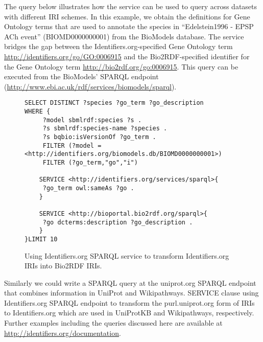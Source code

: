 \documentclass{bioinfo}
\begin{document}
The query below illustrates how the service can be used to query across datasets with different IRI schemes. In this example, we obtain the definitions for Gene Ontology terms that are used to annotate the species in ``Edelstein1996 - EPSP ACh event'' (BIOMD0000000001) from the BioModels database. The service bridges the gap between the Identifiers.org-specified Gene Ontology term \href{http://identifiers.org/go/GO:0006915}{http://identifiers.org/go/GO:0006915} and the Bio2RDF-specified identifier for the Gene Ontology term \href{http://bio2rdf.org/go:0006915} {http://bio2rdf.org/go:0006915}. This query can be executed from the BioModels' SPARQL endpoint (\href{http://www.ebi.ac.uk/rdf/services/biomodels/sparql}{http://www.ebi.ac.uk/rdf/services/biomodels/sparql}).

\begin{figure}[h]
{\scriptsize
\begin{verbatim}
SELECT DISTINCT ?species ?go_term ?go_description 
WHERE {
     ?model sbmlrdf:species ?s . 
	 ?s sbmlrdf:species-name ?species .
     ?s bqbio:isVersionOf ?go_term .
	 FILTER (?model = <http://identifiers.org/biomodels.db/BIOMD0000000001>)
	 FILTER (?go_term,"go","i")
	
	SERVICE <http://identifiers.org/services/sparql>{
     ?go_term owl:sameAs ?go .
	}
		
	SERVICE <http://bioportal.bio2rdf.org/sparql>{
     ?go dcterms:description ?go_description .
	}
}LIMIT 10
\end{verbatim}
}
\caption{Using Identifiers.org SPARQL service to transform Identifiers.org IRIs into Bio2RDF IRIs.}
\label{translatestuff}
\end{figure}

Similarly we could write a SPARQL query at the uniprot.org SPARQL endpoint that combines information in UniProt and Wikipathways. SERVICE clause using Identifiers.org SPARQL endpoint to transform the purl.uniprot.org form of IRIs to Identifiers.org which are used in UniProtKB and Wikipathways, respectively. Further examples including the queries discussed here are available at \href{http://identifiers.org/documentation}{http://identifiers.org/documentation}.
\end{document}
